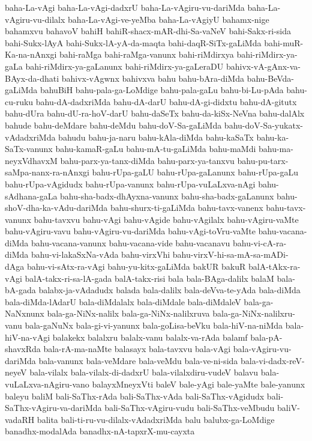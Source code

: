 {baha-La-vAgi
baha-La-vAgi-dadxrU
baha-La-vAgiru-vu-dariMda
baha-La-vAgiru-vu-dilalx
baha-La-vAgi-ve-yeMba
baha-La-vAgiyU
bahamx-nige
bahamxvu
bahavoV
bahiH
bahiR-shacx-mAR-dhi-Sa-vaNeV
bahi-Sakx-ri-sida
bahi-Sukx-lAyA
bahi-Sukx-lA-yA-da-maqta
bahi-daqR-SiTx-gaLiMda
bahi-muR-Ka-na-nAnxgi
bahi-raMga
bahi-raMga-vanunx
bahi-riMdirxya
bahi-riMdirx-ya-gaLa
bahi-riMdirx-ya-gaLanunx
bahi-riMdirx-ya-gaLeraDU
bahivx-vA-gAnx-va-BAyx-da-dhati
bahivx-vAgwnx
bahivxva
bahu
bahu-bAra-diMda
bahu-BeVda-gaLiMda
bahuBiH
bahu-pala-ga-LoMdige
bahu-pala-gaLu
bahu-bi-Lu-pAda
bahu-cu-ruku
bahu-dA-dadxriMda
bahu-dA-darU
bahu-dA-gi-didxtu
bahu-dA-gitutx
bahu-dUra
bahu-dU-ra-hoV-darU
bahu-daSeTx
bahu-da-kiSx-NeVna
bahu-dalAlx
bahude
bahu-deMdare
bahu-deMdu
bahu-doV-Sa-gaLiMda
bahu-doV-Sa-yukatx-vAdadxriMda
bahudu
bahu-ja-naru
bahu-kAla-diMda
bahu-kaSaTx
bahu-ka-SaTx-vanunx
bahu-kamaR-gaLu
bahu-mA-tu-gaLiMda
bahu-maMdi
bahu-ma-neyxVdhavxM
bahu-parx-ya-tanx-diMda
bahu-parx-ya-tanxvu
bahu-pu-tarx-saMpa-nanx-ra-nAnxgi
bahu-rUpa-gaLU
bahu-rUpa-gaLanunx
bahu-rUpa-gaLu
bahu-rUpa-vAgidudx
bahu-rUpa-vanunx
bahu-rUpa-vuLaLxva-nAgi
bahu-sAdhana-gaLa
bahu-sha-badx-dhAyxna-vanunx
bahu-sha-badx-gaLanunx
bahu-shoV-dha-ka-vAdu-dariMda
bahu-shurx-ti-gaLiMda
bahu-tavx-vanenx
bahu-tavx-vanunx
bahu-tavxvu
bahu-vAgi
bahu-vAgide
bahu-vAgilalx
bahu-vAgiru-vaMte
bahu-vAgiru-vavu
bahu-vAgiru-vu-dariMda
bahu-vAgi-toVru-vaMte
bahu-vacana-diMda
bahu-vacana-vanunx
bahu-vacana-vide
bahu-vacanavu
bahu-vi-cA-ra-diMda
bahu-vi-lakaSxNa-vAda
bahu-virxVhi
bahu-virxV-hi-sa-mA-sa-mADi-dAga
bahu-vi-sAtx-ra-vAgi
bahu-yu-kitx-gaLiMda
bakUR
bakuR
balA-tAkx-ra-vAgi
balA-takx-ri-sa-lA-gada
balA-takx-risi
bala
bala-BAga-dalilx
balaM
bala-bA-gada
balabx-ja-vAdadudx
balada
bala-dalilx
bala-deVva-te-yAda
bala-diMda
bala-diMda-lAdarU
bala-diMdalalx
bala-diMdale
bala-diMdaleV
bala-ga-NaNxnunx
bala-ga-NiNx-nalilx
bala-ga-NiNx-nalilxruva
bala-ga-NiNx-nalilxru-vanu
bala-gaNuNx
bala-gi-vi-yanunx
bala-goLisa-beVku
bala-hiV-na-niMda
bala-hiV-na-vAgi
balakekx
balalxru
balalx-vanu
balalx-va-rAda
balamf
bala-pA-shavxRda
bala-rA-ma-naMte
balasayx
bala-tavxvu
bala-vAgi
bala-vAgiru-vu-dariMda
bala-vanunx
bala-veMdare
bala-veMdu
bala-ve-ni-sida
bala-vi-dadx-reV-neyeV
bala-vilalx
bala-vilalx-di-dadxrU
bala-vilalxdiru-vudeV
balavu
bala-vuLaLxva-nAgiru-vano
balayxMneyxVti
baleV
bale-yAgi
bale-yaMte
bale-yanunx
baleyu
baliM
bali-SaThx-rAda
bali-SaThx-vAda
bali-SaThx-vAgidudx
bali-SaThx-vAgiru-va-dariMda
bali-SaThx-vAgiru-vudu
bali-SaThx-veMbudu
baliV-vadaRH
balita
bali-ti-ru-vu-dilalx-vAdadxriMda
balu
balubx-ga-LoMdige
banadhx-modalAda
banadhx-nA-tapxrX-mu-cayxta
}
